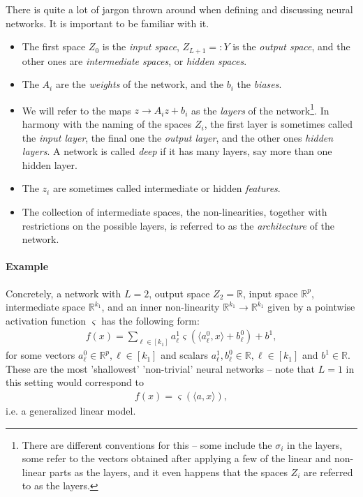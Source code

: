 \documentclass{article}
\newcommand{\sprod}[1]{\langle #1 \rangle}
\newcommand{\R}{\mathbb{R}}
\begin{document}
There is quite a lot of jargon thrown around when defining and discussing neural networks. It is important to be familiar with it.
\begin{itemize}
\item The first space $Z_0$ is the \emph{input space}, $Z_{L+1}=:Y$ is the \emph{output space}, and the other ones are \emph{intermediate spaces}, or \emph{hidden spaces}. 
\item The $A_i$ are the \emph{weights} of the network, and the $b_i$ the \emph{biases}.
\item We will refer to the maps $z\to A_i z + b_i$ as the \emph{layers} of the network\footnote{There are different conventions for this -- some include the $\sigma_i$ in the layers, some refer to the vectors obtained after applying a few of the linear and non-linear parts as the layers, and it even happens that the spaces $Z_i$ are referred to as the layers.}. In harmony with the naming of the spaces $Z_i$, the first layer is sometimes called the \emph{input layer}, the final one the \emph{output layer}, and the other ones \emph{hidden layers}. A network is called \emph{deep} if it has many layers, say more than one hidden layer.
\item The $z_i$ are sometimes called intermediate or hidden \emph{features}.
\item The collection of intermediate spaces, the non-linearities, together with restrictions on the possible layers, is referred to as the \emph{architecture} of the network. 
\end{itemize}

\paragraph{Example} Concretely, a network with $L=2$, output space $Z_2=\R$, input space $\R^p$, intermediate space $\R^{k_1}$, and an inner non-linearity $\R^{k_1} \to \R^{k_1}$ given by a pointwise activation function $\varsigma$ has the following form:
\begin{align*}
    f(x) = \sum_{\ell \in [k_1]} a_{\ell}^1 \varsigma(\sprod{a_\ell^0,x}+b_\ell^0) + b^1,
\end{align*}
for some vectors $a_\ell^0 \in \R^p, \ell \in [k_1]$ and scalars $a_\ell^1, b_\ell^0 \in \R, \ell \in [k_1]$ and $b^1\in \R$. These are the most 'shallowest' 'non-trivial' neural networks -- note that $L=1$ in this setting would correspond to
\begin{align*}
    f(x) = \varsigma(\sprod{a,x}),
\end{align*}
i.e. a generalized linear model. \newline
\end{document}
